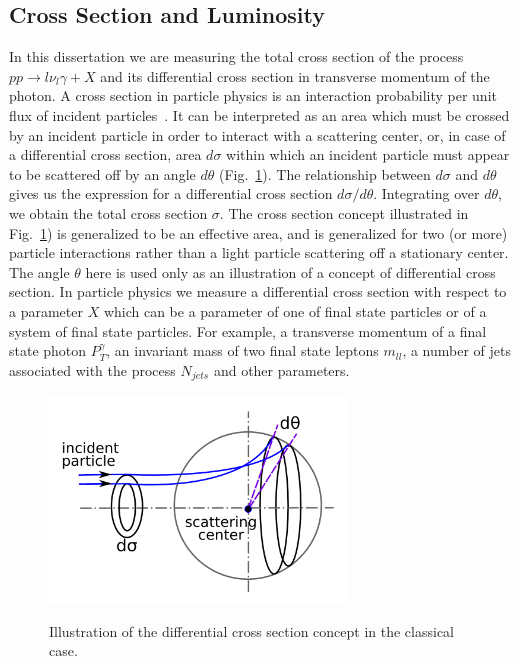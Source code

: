 \subsection{Cross Section and Luminosity}

\label{sec:LumiAndCS}

In this dissertation we are measuring the total cross section of the process $pp \rightarrow l \nu_l \gamma + X$ and its differential cross section in transverse momentum of the photon. A cross section in particle physics is an interaction probability per unit flux of incident particles~\cite{ref_fnal_LumiCS}. It can be interpreted as an area which must be crossed by an incident particle in order to interact with a scattering center, or, in case of a differential cross section, area $d\sigma$ within which an incident particle must appear to be scattered off by an angle $d\theta$ (Fig.~\ref{fig:CSclassical}). The relationship between $d\sigma$ and $d\theta$ gives us the expression for a differential cross section $d\sigma/d\theta$. Integrating over $d\theta$, we obtain the total cross section $\sigma$. The cross section concept illustrated in Fig.~\ref{fig:CSclassical}) is generalized to be an effective area, and is generalized for two (or more) particle interactions rather than a light particle scattering off a stationary center. \\

The angle $\theta$ here is used only as an illustration of a concept of differential cross section. In particle physics we measure a differential cross section with respect to a parameter $X$ which can be a parameter of one of final state particles or of a system of final state particles. For example, a transverse momentum of a final state photon $P_T^\gamma$, an invariant mass of two final state leptons $m_{ll}$, a number of jets associated with the process $N_{jets}$ and other parameters. \\

\begin{figure}[htb]
  \begin{center}
    {\includegraphics[width=0.70\textwidth]{../figs/WgAbout/CSclassical.png}}
    \caption{Illustration of the differential cross section concept in the classical case.}
    \label{fig:CSclassical}
  \end{center}
\end{figure}

